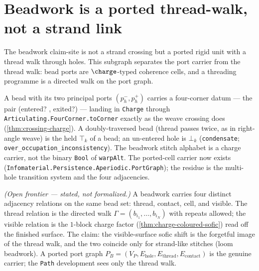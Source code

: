 \section{Beadwork is a ported thread-walk, not a strand link}

The beadwork claim-site is not a strand crossing but a ported rigid unit with a
thread walk through holes.  This subgraph separates the port carrier from the
thread walk: bead ports are $\charge$-typed coherence cells, and a threading
programme is a directed walk on the port graph.

\begin{theorem}\label{thm:bead-portgraph-carrier}\leanok{}
A bead with its two principal ports
$(p_h^-,p_h^+)$ carries a four-corner datum --- the pair (entered? , exited?) --- landing in
\texttt{Charge} through \texttt{Articulating.FourCorner.toCorner} exactly as the weave crossing does
(\cref{thm:crossing-charge}). A doubly-traversed bead (thread passes twice, as in
right-angle weave) is the held $\top_k$ of a bead; an un-entered hole is $\bot_k$
(\texttt{condensate}; \texttt{over\_occupation\_inconsistency}). The beadwork stitch alphabet is a
charge carrier, not the binary \texttt{Bool} of \texttt{warpAlt}. The ported-cell carrier now
exists (\texttt{Infomaterial.Persistence.Aperiodic.PortGraph}); the residue is the multi-hole transition system and
the four adjacencies.
\end{theorem}

\begin{theorem}\label{thm:bead-thread-walk-distinct}\notready{}
\emph{(Open frontier --- stated, not formalized.)} A beadwork carries four distinct
adjacency relations on the same bead set: thread, contact, cell, and visible.  The thread
relation is the directed walk $\Gamma=(b_{i_1},\dots,b_{i_N})$ with repeats allowed; the
visible relation is the $1$-block charge factor (\cref{thm:charge-coloured-sofic}) read off
the finished surface. The claim: the visible-surface sofic shift is the forgetful image of
the thread walk, and the two coincide only for strand-like stitches (loom beadwork). A
ported port graph $P_B=(V_P,E_{\text{hole}},E_{\text{thread}},E_{\text{contact}})$ is the
genuine carrier; the \texttt{Path} development sees only the thread walk.
\end{theorem}

